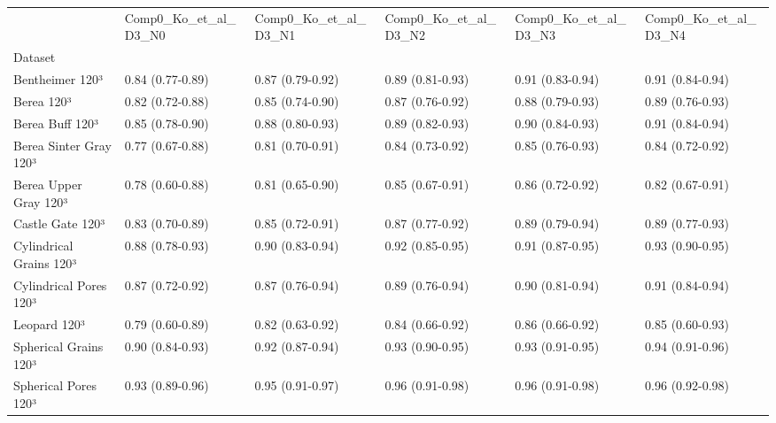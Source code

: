 \begin{tabular}{llllll}
\toprule
 & Comp0_Ko_et_al_D3_N0 & Comp0_Ko_et_al_D3_N1 & Comp0_Ko_et_al_D3_N2 & Comp0_Ko_et_al_D3_N3 & Comp0_Ko_et_al_D3_N4 \\
Dataset &  &  &  &  &  \\
\midrule
Bentheimer 120³ & 0.84 (0.77-0.89) & 0.87 (0.79-0.92) & 0.89 (0.81-0.93) & 0.91 (0.83-0.94) & 0.91 (0.84-0.94) \\
Berea 120³ & 0.82 (0.72-0.88) & 0.85 (0.74-0.90) & 0.87 (0.76-0.92) & 0.88 (0.79-0.93) & 0.89 (0.76-0.93) \\
Berea Buff 120³ & 0.85 (0.78-0.90) & 0.88 (0.80-0.93) & 0.89 (0.82-0.93) & 0.90 (0.84-0.93) & 0.91 (0.84-0.94) \\
Berea Sinter Gray 120³ & 0.77 (0.67-0.88) & 0.81 (0.70-0.91) & 0.84 (0.73-0.92) & 0.85 (0.76-0.93) & 0.84 (0.72-0.92) \\
Berea Upper Gray 120³ & 0.78 (0.60-0.88) & 0.81 (0.65-0.90) & 0.85 (0.67-0.91) & 0.86 (0.72-0.92) & 0.82 (0.67-0.91) \\
Castle Gate 120³ & 0.83 (0.70-0.89) & 0.85 (0.72-0.91) & 0.87 (0.77-0.92) & 0.89 (0.79-0.94) & 0.89 (0.77-0.93) \\
Cylindrical Grains 120³ & 0.88 (0.78-0.93) & 0.90 (0.83-0.94) & 0.92 (0.85-0.95) & 0.91 (0.87-0.95) & 0.93 (0.90-0.95) \\
Cylindrical Pores 120³ & 0.87 (0.72-0.92) & 0.87 (0.76-0.94) & 0.89 (0.76-0.94) & 0.90 (0.81-0.94) & 0.91 (0.84-0.94) \\
Leopard 120³ & 0.79 (0.60-0.89) & 0.82 (0.63-0.92) & 0.84 (0.66-0.92) & 0.86 (0.66-0.92) & 0.85 (0.60-0.93) \\
Spherical Grains 120³ & 0.90 (0.84-0.93) & 0.92 (0.87-0.94) & 0.93 (0.90-0.95) & 0.93 (0.91-0.95) & 0.94 (0.91-0.96) \\
Spherical Pores 120³ & 0.93 (0.89-0.96) & 0.95 (0.91-0.97) & 0.96 (0.91-0.98) & 0.96 (0.91-0.98) & 0.96 (0.92-0.98) \\
\bottomrule
\end{tabular}
